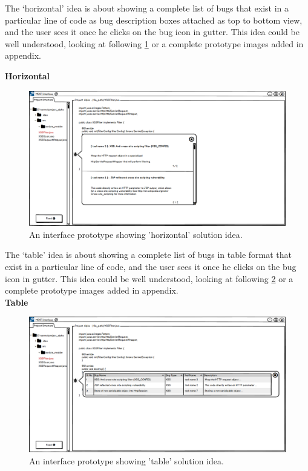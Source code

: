 The ‘horizontal’ idea is about showing a complete list of bugs that exist in a particular line of code as bug description boxes attached as top to bottom view, and the user sees it once he clicks on the bug icon in gutter. This idea could be well understood, looking at following \ref{fig:S31_horizontal} or a complete prototype images added in appendix.

\textbf{Horizontal}
\begin{figure}[hbt!]
	\centering
	\includegraphics[width=\linewidth]{figures/solution_ideas_snaps/S31_horizontal}
	\caption{An interface prototype showing 'horizontal' solution idea.}
	\label{fig:S31_horizontal}
\end{figure} 

The ‘table’ idea is about showing a complete list of bugs in table format that exist in a particular line of code, and the user sees it once he clicks on the bug icon in gutter. This idea could be well understood, looking at following \ref{fig:S31_table} or a complete prototype images added in appendix. \\

\textbf{Table}
\begin{figure}[hbt!]
	\centering
	\includegraphics[width=\linewidth]{figures/solution_ideas_snaps/S31_table}
	\caption{An interface prototype showing 'table' solution idea.}
	\label{fig:S31_table}
\end{figure} 

